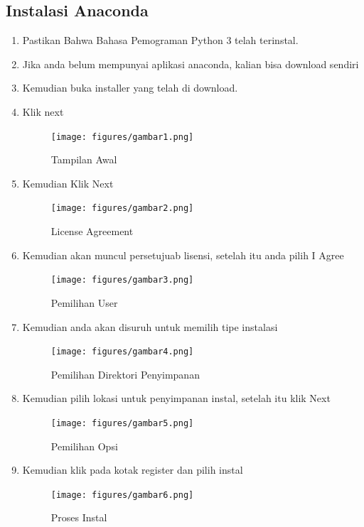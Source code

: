 \subsection{Instalasi Anaconda}
\begin{enumerate}
    \item Pastikan Bahwa Bahasa Pemograman Python 3 telah terinstal.
    \item Jika anda belum mempunyai aplikasi anaconda, kalian bisa download sendiri
    \item Kemudian buka installer yang telah di download.
    \item Klik next
    \begin{figure}[!htbp]
        \centering
        \texttt{[image: figures/gambar1.png]}
        \caption{Tampilan Awal}
        \label{awal}
        \end{figure}

    \item Kemudian Klik Next
    \begin{figure}[!htbp]
        \centering
        \texttt{[image: figures/gambar2.png]}
        \caption{License Agreement}
        \label{License}
        \end{figure}

    \item Kemudian akan muncul persetujuab lisensi, setelah itu anda pilih  I Agree
    \begin{figure}[!htbp]
        \centering
        \texttt{[image: figures/gambar3.png]}
        \caption{Pemilihan User}
        \label{User}
        \end{figure}

    \item Kemudian anda akan disuruh untuk memilih tipe instalasi
    \begin{figure}[!htbp]
        \centering
        \texttt{[image: figures/gambar4.png]}
        \caption{Pemilihan Direktori Penyimpanan}
        \label{Directory}
        \end{figure}

    \item Kemudian pilih lokasi untuk penyimpanan instal, setelah itu klik Next
    \begin{figure}[!htbp]
        \centering
        \texttt{[image: figures/gambar5.png]}
        \caption{Pemilihan Opsi}
        \label{opsi}
        \end{figure}

    \item Kemudian klik pada kotak register dan pilih instal
    \begin{figure}[!htbp]
        \centering
        \texttt{[image: figures/gambar6.png]}
        \caption{Proses Instal}
        \label{Proses}
        \end{figure}


\end{enumerate}
